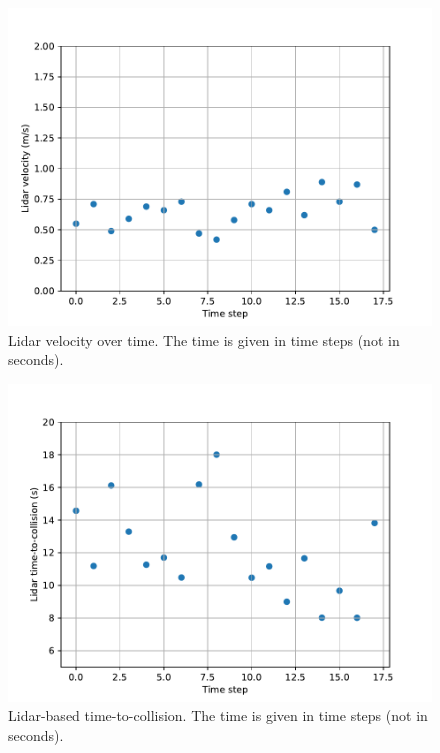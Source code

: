 \documentclass[a4paper]{scrartcl}
\begin{document}
\begin{figure}
	\centering
	\includegraphics[width=0.8\columnwidth]{./img/lidar_velocities}
	\caption{Lidar velocity over time. The time is given in time steps
			(not in seconds).}
	\label{fig:lidar_velocities}
\end{figure}

\begin{figure}
	\centering
	\includegraphics[width=0.8\columnwidth]{./img/lidar_ttc}
	\caption{Lidar-based time-to-collision. The time is given in time steps
			(not in seconds).}
	\label{fig:lidar_ttc}
\end{figure}
\end{document}
